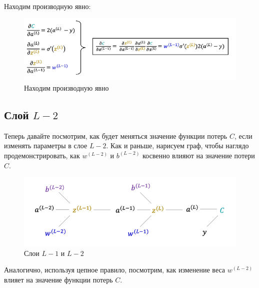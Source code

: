\documentclass[a4paper, 10pt, openany]{book} %
\begin{document}
	Находим производную явно:
	
	\begin{figure}[h!]
		\centering
		\includegraphics[width=\linewidth]{pictures/backpropagation/last_activation_itself.png}
		\caption{Находим производную явно}
		\label{last_activation_itself}
	\end{figure}

	\subsection{Слой $L-2$}
	
	Теперь давайте посмотрим, как будет меняться значение функции потерь $C$, если изменять параметры в слое $L-2$. Как и раньше, нарисуем граф, чтобы наглядо продемонстрировать, как $w^{(L-2)}$ и $b^{(L-2)}$ косвенно влияют на значение потери $C$.
	
	\begin{figure}[h!]
		\centering
		\includegraphics[width=\linewidth]{pictures/backpropagation/first_layer.png}
		\caption{Слои $L-1$ и $L-2$}
		\label{first_layer}
	\end{figure}

	Аналогично, используя цепное правило, посмотрим, как изменение веса $w^{(L-2)}$ влияет на значение функции потерь $C$.
	
\end{document}
